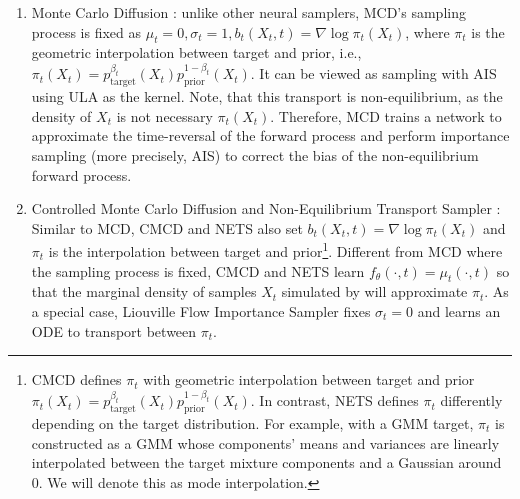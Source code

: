 \begin{enumerate}[label=({{\arabic*}}), leftmargin=*]
        \item Monte Carlo Diffusion \citep[MCD,][]{doucet2022score}: unlike other neural samplers, MCD's sampling process is fixed as $\mu_t = 0, \sigma_t = 1, b_t(X_t, t) = \nabla \log \pi_t(X_t)$, where $\pi_t$ is the geometric interpolation between target and prior, i.e., $\pi_t(X_t) = p_\text{target}^{\beta_t}(X_t)p_\text{prior}^{1-\beta_t}(X_t)$.
    It can be viewed as sampling with AIS using ULA as the kernel.
    Note, that this transport is non-equilibrium, as the density of $X_t$ is not necessary $\pi_t(X_t)$.
    Therefore, MCD trains a network to approximate the time-reversal of the forward process and perform importance sampling (more precisely, AIS) to correct the bias of the non-equilibrium forward process.
        \item Controlled Monte Carlo Diffusion \citep[CMCD,][]{vargas2024transport} and Non-Equilibrium Transport Sampler \citep[NETS,][]{mate2023learning,albergo2024nets}: 
        Similar to MCD, CMCD and NETS also set $b_t(X_t, t) = \nabla \log \pi_t(X_t)$ and $\pi_t$ is the interpolation between target and prior\footnote{CMCD defines $\pi_t$ with geometric interpolation between target and prior  $\pi_t(X_t) = p_\text{target}^{\beta_t}(X_t)p_\text{prior}^{1-\beta_t}(X_t)$.
         In contrast, NETS defines 
 $\pi_t$ differently depending on the target distribution. 
 For example, with a GMM target, 
 $\pi_t$ is constructed as a GMM whose components' means and variances are linearly interpolated between the target mixture components and a Gaussian around 0. We will denote this as mode interpolation.
}.
Different from MCD where the sampling process is fixed, CMCD and NETS learn $f_\theta(\cdot, t) = \mu_t(\cdot, t)$ so that the marginal density of samples $X_t$ simulated by  will approximate $\pi_t$.
As a special case, Liouville Flow Importance Sampler \citep[LFIS,][]{tian2024liouville} fixes $\sigma_t=0$ and learns an ODE to transport between $\pi_t$.

    
\end{enumerate}




\vspace{-5pt}
